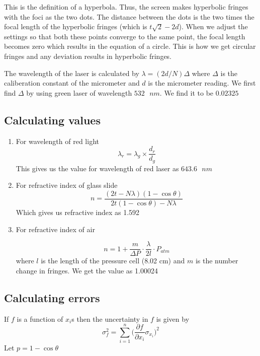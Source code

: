 \documentclass[12pt]{article}
\newlength\fwidth
\newlength\fheight
\begin{document}
This is the definition of a hyperbola.
Thus, the screen makes hyperbolic fringes with the foci as the two dots.
The distance between the dots is the two times the focal length of the hyperbolic fringes (which is $t\sqrt{2}-2d$).
When we adjust the settings so that both these points converge to the same point, the focal length becomes zero which results in the equation of a circle. This is how we get circular fringes and any deviation results in hyperbolic fringes.
\pagebreak

The wavelength of the laser is calculated by \(\lambda = (2d/N)\Delta\) where $\Delta$ is the caliberation constant of the micrometer and $d$ is the micrometer reading.
We first find $\Delta$ by using green laser of wavelength $532 \text{ }nm$.
We find it to be $0.02325$
\subsection*{Calculating values}
\begin{enumerate}
    \item For wavelength of red light
    \[\lambda_r = \lambda_g\times \frac{d_r}{d_g}\]
    This gives us the value for wavelength of red laser as $643.6\text{ }nm$
    \item For refractive index of glass slide
    \[n =\frac{(2t-N\lambda)(1-\cos \theta)}{2t(1-\cos \theta)-N\lambda}\]
    Which gives us refractive index as 1.592
    \item For refractive index of air
    \begin{figure}[H]
        \centering
        \setlength{}
        \setlength{}
        
    \end{figure}
    \[n = 1 + \frac{m}{\Delta P}\cdot \frac{\lambda}{2l}\cdot P_{atm}\] where $l$ is the length of the pressure cell (8.02 cm) and $m$ is the number change in fringes.
    We get the value as 1.00024
\end{enumerate}
\subsection*{Calculating errors}
If $f$ is a function of $x_i$s then the uncertainty in $f$ is given by
\[\sigma_f^2=\sum_{i = 1}^{n} \bigg(\frac{\partial f}{\partial x_i}\sigma_{x_i}\bigg)^2 \]
Let $p = 1-\cos\theta$
\end{document}
